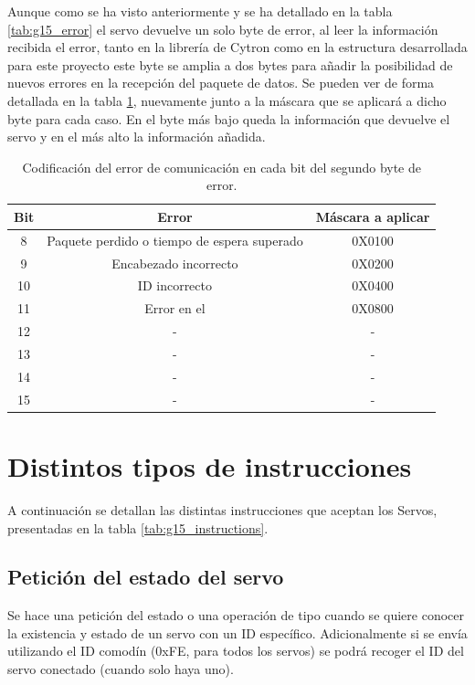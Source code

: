 	Aunque como se ha visto anteriormente y se ha detallado en la tabla \ref{tab:g15_error} el servo devuelve un solo byte de error, al leer la información recibida el error, tanto en la librería de Cytron como en la estructura desarrollada para este proyecto este byte se amplia a dos bytes para añadir la posibilidad de nuevos errores en la recepción del paquete de datos. Se pueden ver de forma detallada en la tabla \ref{tab:g15_error_second}, nuevamente junto a la máscara que se aplicará a dicho byte para cada caso. En el byte más bajo queda la información que devuelve el servo y en el más alto la información añadida.
	\\

	\begin{table}[htbp]
		\centering
		\caption{Codificación del error de comunicación en cada bit del segundo byte de error.}
		\label{tab:g15_error_second}
		\begin{center}
			\begin{tabular}{|c|c|c|}
				\hline
				\textbf{Bit} & \textbf{Error} & \textbf{Máscara a aplicar} \\
				\hline
				8 & Paquete perdido o tiempo de espera superado & 0X0100 \\
				\hline
				9 & Encabezado incorrecto & 0X0200 \\
				\hline
				10 & ID incorrecto & 0X0400 \\
				\hline
				11 & Error en el \ingles{CheckSum} & 0X0800 \\
				\hline
				12 & - & -  \\
				\hline
				13 & - & -  \\
				\hline
				14 & - & -  \\
				\hline
				15 & - & -  \\
				\hline
			\end{tabular}
		\end{center}
	\end{table}
	\section{Distintos tipos de instrucciones}
	A continuación se detallan las distintas instrucciones que aceptan los Servos, presentadas en la tabla \ref{tab:g15_instructions}.
	\subsection{Petición del estado del servo}

	Se hace una petición del estado o una operación de tipo  cuando se quiere conocer la existencia y estado de un servo con un ID específico. Adicionalmente si se envía utilizando el ID comodín (0xFE, para todos los servos) se podrá recoger el ID del servo conectado (cuando solo haya uno).
	\\

